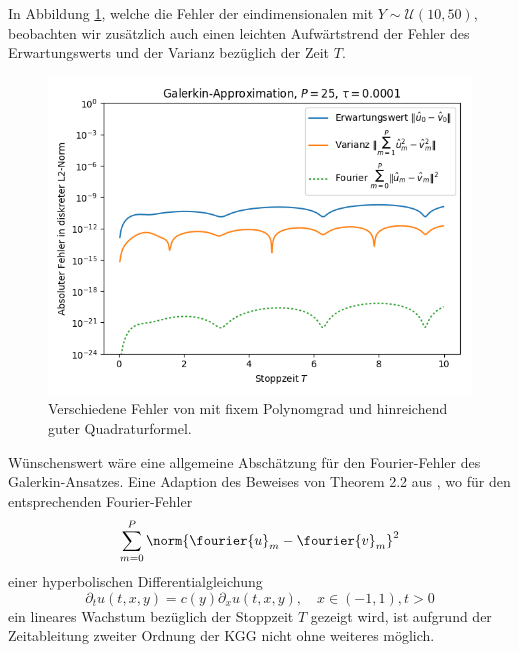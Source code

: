 \newline
In Abbildung \ref{fig:galerkin_bystoptime_trial3}, welche die Fehler der eindimensionalen  mit $Y\sim\mathcal{U}(10,50)$, beobachten wir zusätzlich auch einen leichten Aufwärtstrend der Fehler des Erwartungswerts und der Varianz bezüglich der Zeit $T$.\\
\begin{figure}[!htb]
\centering
\includegraphics[width=0.75\linewidth]{Figures/galerkin_bystoptime_trial3_fixeddegree25_big.png}
\caption{Verschiedene Fehler von  mit fixem Polynomgrad und hinreichend guter Quadraturformel.}
\label{fig:galerkin_bystoptime_trial3}
\end{figure}
Wünschenswert wäre eine allgemeine Abschätzung für den Fourier-Fehler des Galerkin-Ansatzes. Eine Adaption des Beweises von Theorem 2.2 aus \autocite{davidgottliebdongbinxiu2008}, wo für den entsprechenden Fourier-Fehler
\[\sum_{m=0}^P\norm{\fourier{u}_m-\fourier{v}_m}^2\]
einer hyperbolischen Differentialgleichung 
\[\partial_t u(t,x,y)=c(y)\partial_x u(t,x,y),\quad x\in (-1,1),t>0\]
ein lineares Wachstum bezüglich der Stoppzeit $T$ gezeigt wird, ist aufgrund der Zeitableitung zweiter Ordnung der KGG nicht ohne weiteres möglich.
